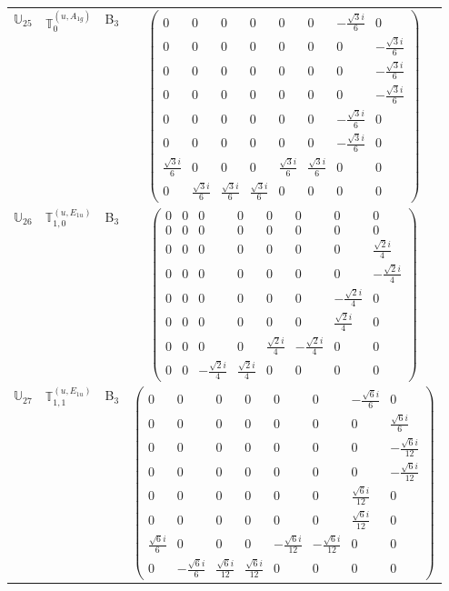 \documentclass[fleqn,10pt,landscape]{article}
\begin{document}
\begin{itemize}
\begin{center}
\begin{longtable}{c|c|c|c}
$ \mathbb{U}_{25} $ & $\mathbb{T}_{0}^{(u,A_{1g})}$ & B$_{3}$ & $\begin{pmatrix} 0 & 0 & 0 & 0 & 0 & 0 & - \frac{\sqrt{3} i}{6} & 0 \\ 0 & 0 & 0 & 0 & 0 & 0 & 0 & - \frac{\sqrt{3} i}{6} \\ 0 & 0 & 0 & 0 & 0 & 0 & 0 & - \frac{\sqrt{3} i}{6} \\ 0 & 0 & 0 & 0 & 0 & 0 & 0 & - \frac{\sqrt{3} i}{6} \\ 0 & 0 & 0 & 0 & 0 & 0 & - \frac{\sqrt{3} i}{6} & 0 \\ 0 & 0 & 0 & 0 & 0 & 0 & - \frac{\sqrt{3} i}{6} & 0 \\ \frac{\sqrt{3} i}{6} & 0 & 0 & 0 & \frac{\sqrt{3} i}{6} & \frac{\sqrt{3} i}{6} & 0 & 0 \\ 0 & \frac{\sqrt{3} i}{6} & \frac{\sqrt{3} i}{6} & \frac{\sqrt{3} i}{6} & 0 & 0 & 0 & 0 \end{pmatrix}$ \\
$ \mathbb{U}_{26} $ & $\mathbb{T}_{1,0}^{(u,E_{1u})}$ & B$_{3}$ & $\begin{pmatrix} 0 & 0 & 0 & 0 & 0 & 0 & 0 & 0 \\ 0 & 0 & 0 & 0 & 0 & 0 & 0 & 0 \\ 0 & 0 & 0 & 0 & 0 & 0 & 0 & \frac{\sqrt{2} i}{4} \\ 0 & 0 & 0 & 0 & 0 & 0 & 0 & - \frac{\sqrt{2} i}{4} \\ 0 & 0 & 0 & 0 & 0 & 0 & - \frac{\sqrt{2} i}{4} & 0 \\ 0 & 0 & 0 & 0 & 0 & 0 & \frac{\sqrt{2} i}{4} & 0 \\ 0 & 0 & 0 & 0 & \frac{\sqrt{2} i}{4} & - \frac{\sqrt{2} i}{4} & 0 & 0 \\ 0 & 0 & - \frac{\sqrt{2} i}{4} & \frac{\sqrt{2} i}{4} & 0 & 0 & 0 & 0 \end{pmatrix}$ \\
$ \mathbb{U}_{27} $ & $\mathbb{T}_{1,1}^{(u,E_{1u})}$ & B$_{3}$ & $\begin{pmatrix} 0 & 0 & 0 & 0 & 0 & 0 & - \frac{\sqrt{6} i}{6} & 0 \\ 0 & 0 & 0 & 0 & 0 & 0 & 0 & \frac{\sqrt{6} i}{6} \\ 0 & 0 & 0 & 0 & 0 & 0 & 0 & - \frac{\sqrt{6} i}{12} \\ 0 & 0 & 0 & 0 & 0 & 0 & 0 & - \frac{\sqrt{6} i}{12} \\ 0 & 0 & 0 & 0 & 0 & 0 & \frac{\sqrt{6} i}{12} & 0 \\ 0 & 0 & 0 & 0 & 0 & 0 & \frac{\sqrt{6} i}{12} & 0 \\ \frac{\sqrt{6} i}{6} & 0 & 0 & 0 & - \frac{\sqrt{6} i}{12} & - \frac{\sqrt{6} i}{12} & 0 & 0 \\ 0 & - \frac{\sqrt{6} i}{6} & \frac{\sqrt{6} i}{12} & \frac{\sqrt{6} i}{12} & 0 & 0 & 0 & 0 \end{pmatrix}$ \\

\end{longtable}
\end{center}
\end{itemize}
\end{document}

